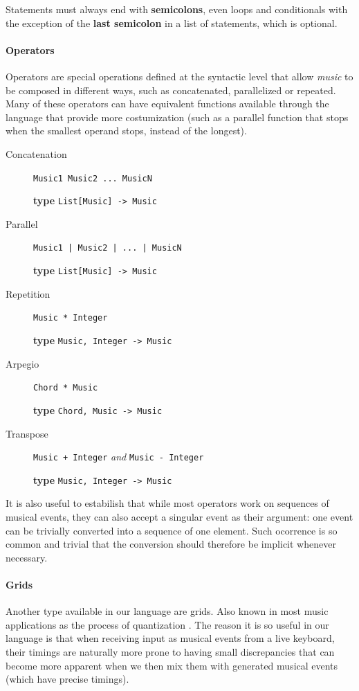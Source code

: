 \documentclass[a4paper,UKenglish,cleveref, autoref]{oasics-v2019}
\begin{document}
Statements must always end with \textbf{semicolons}, even loops and conditionals with the exception of the \textbf{last semicolon} in a list of statements, which is optional.

\paragraph*{Operators}
Operators are special operations defined at the syntactic level that allow \textit{music} to be composed in different ways, such as concatenated, parallelized or repeated. Many of these operators can have equivalent functions available through the language that provide more costumization (such as a parallel function that stops when the smallest operand stops, instead of the longest).

\begin{description}
    \item[Concatenation] \verb|Music1 Music2 ... MusicN|
    
        \textbf{type} \verb|List[Music] -> Music|
    \item[Parallel] \verb'Music1 | Music2 | ... | MusicN'
        
        \textbf{type} \verb|List[Music] -> Music|
    \item[Repetition] \verb'Music * Integer'
    
        \textbf{type} \verb|Music, Integer -> Music|
    \item[Arpegio] \verb'Chord * Music'
        
        \textbf{type} \verb|Chord, Music -> Music|
    \item[Transpose] \verb'Music + Integer' \textit{and} \verb'Music - Integer'
    
        \textbf{type} \verb|Music, Integer -> Music|
\end{description}


It is also useful to estabilish that while most operators work on sequences of musical events, they can also accept a singular event as their argument: one event can be trivially converted into a sequence of one element. Such ocorrence is so common and trivial that the conversion should therefore be implicit whenever necessary.

\paragraph*{Grids}
Another type available in our language are grids. Also known in most music applications as the process of quantization \cite{Quantization}. The reason it is so useful in our language is that when receiving input as musical events from a live keyboard, their timings are naturally more prone to having small discrepancies that can become more apparent when we then mix them with generated musical events (which have precise timings).
\end{document}
